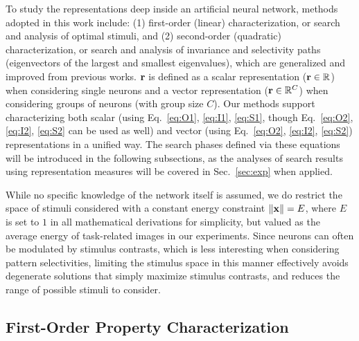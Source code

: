 \documentclass[10pt,twocolumn,letterpaper]{article}
\begin{document}

To study the representations deep inside an artificial neural network, methods adopted in this work include: (1) first-order (\ie linear) characterization, or search and analysis of optimal stimuli, and (2) second-order (\ie quadratic) characterization, or search and analysis of invariance and selectivity paths (\ie eigenvectors of the largest and smallest eigenvalues), which are generalized and improved from previous works.
$\bf{r}$ is defined as a scalar representation (\ie $\bf{r} \in \mathbb{R}$) when considering single neurons and a vector representation (\ie ${\bf{r}} \in \mathbb{R}^C$) when considering groups of neurons (with group size $C$).
Our methods support characterizing both scalar (using Eq.~\ref{eq:O1}, \ref{eq:I1}, \ref{eq:S1}, though Eq.~\ref{eq:O2}, \ref{eq:I2}, \ref{eq:S2} can be used as well) and vector (using Eq.~\ref{eq:O2}, \ref{eq:I2}, \ref{eq:S2}) representations in a unified way.
The search phases defined via these equations will be introduced in the following subsections, as the analyses of search results using representation measures will be covered in Sec.~\ref{sec:exp} when applied.


While no specific knowledge of the network itself is assumed, we do restrict the space of stimuli considered with a constant energy constraint $\left\| \bf{x} \right\| = E$, where $E$ is set to $1$ in all mathematical derivations for simplicity, but valued as the average energy of task-related images in our experiments.
Since neurons can often be modulated by stimulus contrasts, which is less interesting when considering pattern selectivities, limiting the stimulus space in this manner effectively avoids degenerate solutions that simply maximize stimulus contrasts, and reduces the range of possible stimuli to consider.


\subsection{First-Order Property Characterization}
\end{document}
